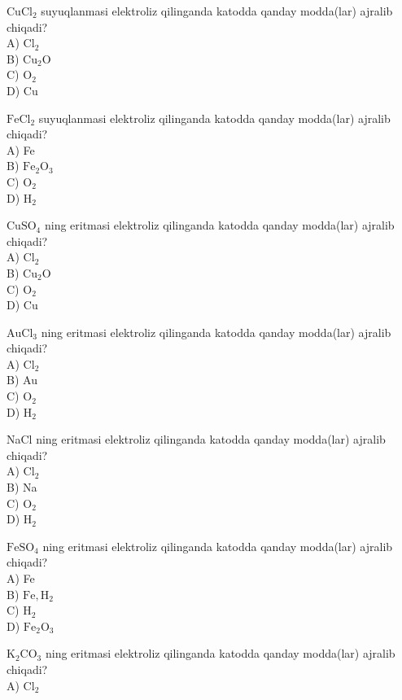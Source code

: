   \item $\mathrm{CuCl}_{2}$ suyuqlanmasi elektroliz qilinganda katodda qanday modda(lar) ajralib chiqadi?\\
A) $\mathrm{Cl}_{2}$\\
B) $\mathrm{Cu}_{2} \mathrm{O}$\\
C) $\mathrm{O}_{2}$\\
D) Cu
  \item $\mathrm{FeCl}_{2}$ suyuqlanmasi elektroliz qilinganda katodda qanday modda(lar) ajralib chiqadi?\\
A) Fe\\
B) $\mathrm{Fe}_{2} \mathrm{O}_{3}$\\
C) $\mathrm{O}_{2}$\\
D) $\mathrm{H}_{2}$
  \item $\mathrm{CuSO}_{4}$ ning eritmasi elektroliz qilinganda katodda qanday modda(lar) ajralib chiqadi?\\
A) $\mathrm{Cl}_{2}$\\
B) $\mathrm{Cu}_{2} \mathrm{O}$\\
C) $\mathrm{O}_{2}$\\
D) Cu
  \item $\mathrm{AuCl}_{3}$ ning eritmasi elektroliz qilinganda katodda qanday modda(lar) ajralib chiqadi?\\
A) $\mathrm{Cl}_{2}$\\
B) Au\\
C) $\mathrm{O}_{2}$\\
D) $\mathrm{H}_{2}$
  \item NaCl ning eritmasi elektroliz qilinganda katodda qanday modda(lar) ajralib chiqadi?\\
A) $\mathrm{Cl}_{2}$\\
B) Na\\
C) $\mathrm{O}_{2}$\\
D) $\mathrm{H}_{2}$
  \item $\mathrm{FeSO}_{4}$ ning eritmasi elektroliz qilinganda katodda qanday modda(lar) ajralib chiqadi?\\
A) Fe\\
B) $\mathrm{Fe}, \mathrm{H}_{2}$\\
C) $\mathrm{H}_{2}$\\
D) $\mathrm{Fe}_{2} \mathrm{O}_{3}$
  \item $\mathrm{K}_{2} \mathrm{CO}_{3}$ ning eritmasi elektroliz qilinganda katodda qanday modda(lar) ajralib chiqadi?\\
A) $\mathrm{Cl}_{2}$\\
